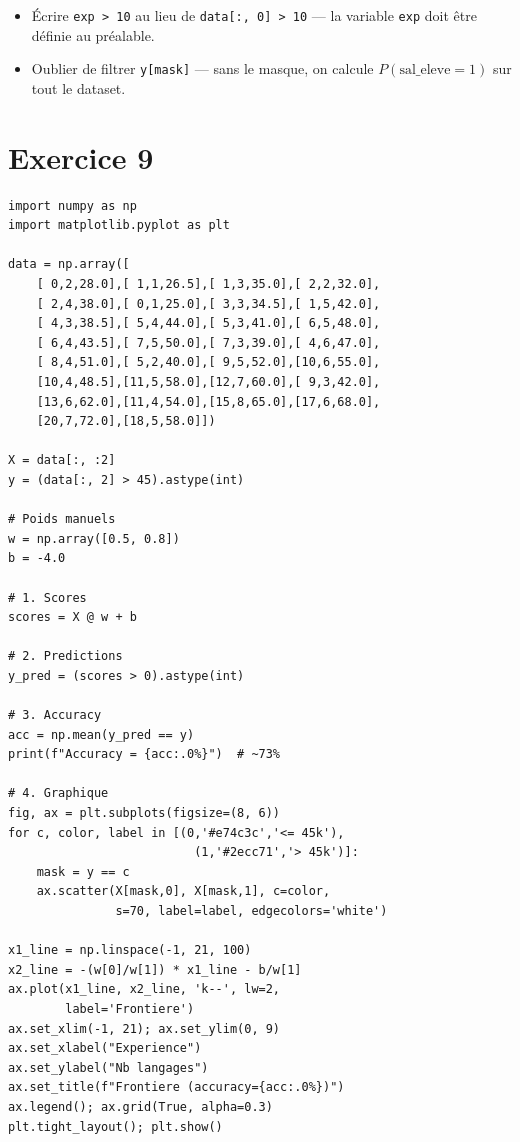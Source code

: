 \begin{attentionbox}
\begin{itemize}
    \item \'{E}crire \texttt{exp > 10} au lieu de \texttt{data[:, 0] > 10} --- la variable \texttt{exp} doit \^{e}tre d\'{e}finie au pr\'{e}alable.
    \item Oublier de filtrer \texttt{y[mask]} --- sans le masque, on calcule $P(\text{sal\_eleve}=1)$ sur tout le dataset.
\end{itemize}
\end{attentionbox}

\section*{Exercice 9 \hfill \exointermediaire}

\separateur

\begin{pythonbox}
\begin{lstlisting}
import numpy as np
import matplotlib.pyplot as plt

data = np.array([
    [ 0,2,28.0],[ 1,1,26.5],[ 1,3,35.0],[ 2,2,32.0],
    [ 2,4,38.0],[ 0,1,25.0],[ 3,3,34.5],[ 1,5,42.0],
    [ 4,3,38.5],[ 5,4,44.0],[ 5,3,41.0],[ 6,5,48.0],
    [ 6,4,43.5],[ 7,5,50.0],[ 7,3,39.0],[ 4,6,47.0],
    [ 8,4,51.0],[ 5,2,40.0],[ 9,5,52.0],[10,6,55.0],
    [10,4,48.5],[11,5,58.0],[12,7,60.0],[ 9,3,42.0],
    [13,6,62.0],[11,4,54.0],[15,8,65.0],[17,6,68.0],
    [20,7,72.0],[18,5,58.0]])

X = data[:, :2]
y = (data[:, 2] > 45).astype(int)

# Poids manuels
w = np.array([0.5, 0.8])
b = -4.0

# 1. Scores
scores = X @ w + b

# 2. Predictions
y_pred = (scores > 0).astype(int)

# 3. Accuracy
acc = np.mean(y_pred == y)
print(f"Accuracy = {acc:.0%}")  # ~73%

# 4. Graphique
fig, ax = plt.subplots(figsize=(8, 6))
for c, color, label in [(0,'#e74c3c','<= 45k'),
                          (1,'#2ecc71','> 45k')]:
    mask = y == c
    ax.scatter(X[mask,0], X[mask,1], c=color,
               s=70, label=label, edgecolors='white')

x1_line = np.linspace(-1, 21, 100)
x2_line = -(w[0]/w[1]) * x1_line - b/w[1]
ax.plot(x1_line, x2_line, 'k--', lw=2,
        label='Frontiere')
ax.set_xlim(-1, 21); ax.set_ylim(0, 9)
ax.set_xlabel("Experience")
ax.set_ylabel("Nb langages")
ax.set_title(f"Frontiere (accuracy={acc:.0%})")
ax.legend(); ax.grid(True, alpha=0.3)
plt.tight_layout(); plt.show()
\end{lstlisting}
\end{pythonbox}

